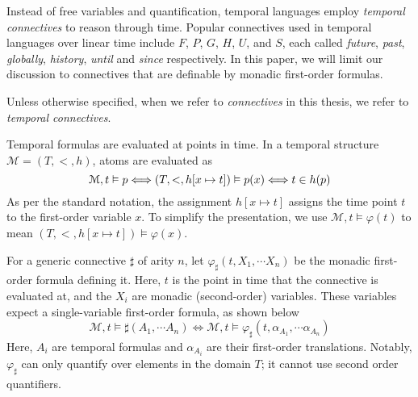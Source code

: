 \documentclass[a4paper,UKenglish,cleveref, autoref, thm-restate, numberwithinsect]{lipics-v2021}
\begin{document}
Instead of free variables and quantification, temporal languages employ \textit{temporal connectives} to reason through time. Popular connectives used in temporal languages over linear time include $F$, $P$, $G$, $H$, $U$, and $S$, each called \textit{future}, \textit{past}, \textit{globally}, \textit{history}, \textit{until} and \textit{since} respectively. In this paper, we will limit our discussion to connectives that are definable by monadic first-order formulas.
\begin{note*}
    Unless otherwise specified, when we refer to \textit{connectives} in this thesis, we refer to \textit{temporal connectives}.
\end{note*}

Temporal formulas are evaluated at points in time. In a temporal structure $\mathcal{M} = (T, <, h)$, atoms are evaluated as
\begin{equation*}
    \mathcal{M}, t \vDash p \Longleftrightarrow (T, <, h[x \mapsto t]) \vDash p(x) \Longleftrightarrow t \in h(p)\\
\end{equation*}
As per the standard notation, the assignment $h[x \mapsto t]$ assigns the time point $t$ to the first-order variable $x$. To simplify the presentation, we use $\mathcal{M}, t \vDash \varphi(t)$ to mean $(T, <, h[x \mapsto t]) \vDash \varphi(x)$.

For a generic connective $\sharp$ of arity $n$, let $\varphi_\sharp(t, X_1, \cdots X_n)$ be the monadic first-order formula defining it. Here, $t$ is the point in time that the connective is evaluated at, and the $X_i$ are monadic (second-order) variables. These variables expect a single-variable first-order formula, as shown below
\begin{equation*}
    \mathcal{M}, t \vDash \sharp(A_1, \cdots A_n) \Longleftrightarrow \mathcal{M}, t \vDash \varphi_\sharp(t, \alpha_{A_1}, \cdots \alpha_{A_n})
\end{equation*}
Here, $A_i$ are temporal formulas and $\alpha_{A_i}$ are their first-order translations. Notably, $\varphi_\sharp$ can only quantify over elements in the domain $T$; it cannot use second order quantifiers.
\end{document}
